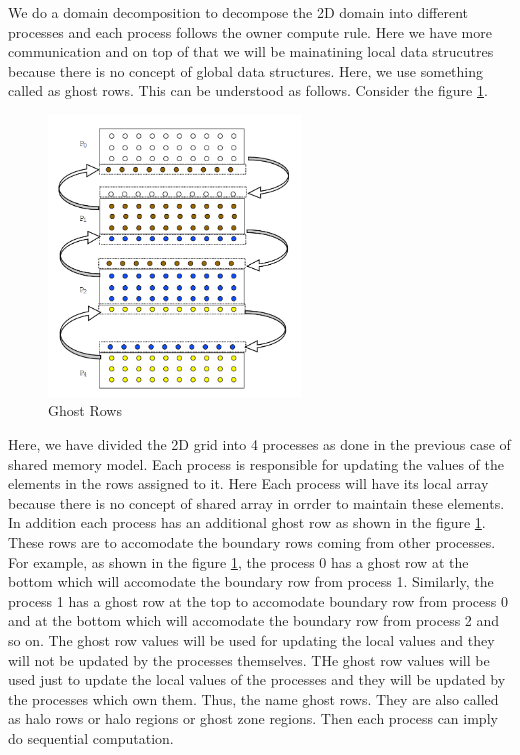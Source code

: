 \documentclass[12pt]{article}
\begin{document}
We do a domain decomposition to decompose the 2D domain into different processes and each process follows the owner compute rule.
Here we have more communication and on top of that we will be mainatining local data strucutres because there is no concept of global data structures.
Here, we use something called as ghost rows. This  can be understood as follows. Consider the figure \ref{fig:ghost}.
\begin{figure}[H]
    \centering
    \includegraphics[width=0.6\textwidth]{images/ghost.png}
    \caption{Ghost Rows}
    \label{fig:ghost}
\end{figure}
Here, we have divided the 2D grid into 4 processes as done in the previous case of shared memory model.
Each process is responsible for updating the values of the elements in the rows assigned to it.
Here Each process will have its local array because there is no concept of shared array in orrder to maintain these elements.
In addition each process has an additional ghost row as shown in the figure \ref{fig:ghost}.
These rows are to accomodate the boundary rows coming from other processes. For example, as shown in the figure \ref{fig:ghost},
the process 0 has a ghost row at the bottom which will accomodate the boundary row from process 1. Similarly, the process 1 has a ghost row at the top to accomodate boundary row from process 0
and at the bottom which will accomodate the boundary row from process 2 and so on.
The ghost row values will be used for updating the local values and they will not be updated by the processes themselves.
THe ghost row values will be used just to update the local values of the processes and they will be updated by the processes which own them.
Thus, the name ghost rows. They are also called as halo rows or halo regions or ghost zone regions.
Then each process can imply do sequential computation.
\end{document}
